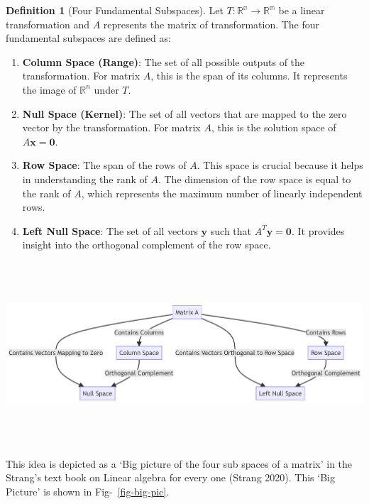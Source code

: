 \documentclass[
  letterpaper,
  DIV=11,
  numbers=noendperiod]{scrreprt}
\theoremstyle{plain}
\theoremstyle{definition}
\newtheorem{definition}{Definition}[chapter]
\theoremstyle{remark}
\begin{document}
\begin{tcolorbox}
\begin{definition}[Four Fundamental
Subspaces]
Let \(T:\mathbb{R^n}\longrightarrow \mathbb{R^m}\) be a linear
transformation and \(A\) represents the matrix of transformation. The
four fundamental subspaces are defined as:

\begin{enumerate}
\def\labelenumi{\arabic{enumi}.}
\item
  \textbf{Column Space (Range)}: The set of all possible outputs of the
  transformation. For matrix \(A\), this is the span of its columns. It
  represents the image of \(\mathbb{R}^n\) under \(T\).
\item
  \textbf{Null Space (Kernel)}: The set of all vectors that are mapped
  to the zero vector by the transformation. For matrix \(A\), this is
  the solution space of \(A \mathbf{x} = \mathbf{0}\).
\item
  \textbf{Row Space}: The span of the rows of \(A\). This space is
  crucial because it helps in understanding the rank of \(A\). The
  dimension of the row space is equal to the rank of \(A\), which
  represents the maximum number of linearly independent rows.
\item
  \textbf{Left Null Space}: The set of all vectors \(\mathbf{y}\) such
  that \(A^T \mathbf{y} = \mathbf{0}\). It provides insight into the
  orthogonal complement of the row space.
\end{enumerate}

\end{definition}

\includegraphics[width=9.49in,height=2.67in]{module_2_files/figure-latex/mermaid-figure-1.png}

This idea is depicted as a `Big picture of the four sub spaces of a
matrix' in the Strang's text book on Linear algebra for every one
(Strang 2020). This `Big Picture' is shown in Fig-~\ref{fig-big-pic}.

\begin{figure}[H]


\end{figure}
\end{tcolorbox}
\end{document}
